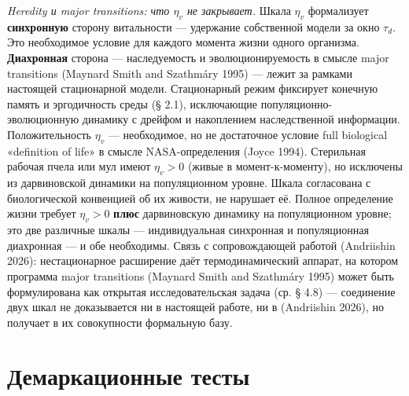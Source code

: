 \documentclass[pdflatex,sn-mathphys-ay]{sn-jnl}
\begin{document}
\emph{Heredity и major transitions: что \(\eta_v\) не закрывает.} Шкала \(\eta_v\) формализует \textbf{синхронную} сторону витальности --- удержание собственной модели за окно \(\tau_d\). Это необходимое условие для каждого момента жизни одного организма. \textbf{Диахронная} сторона --- наследуемость и эволюционируемость в смысле major transitions (Maynard Smith and Szathmáry 1995) --- лежит за рамками настоящей стационарной модели. Стационарный режим фиксирует конечную память и эргодичность среды (§ 2.1), исключающие популяционно-эволюционную динамику с дрейфом и накоплением наследственной информации. Положительность \(\eta_v\) --- необходимое, но не достаточное условие full biological «definition of life» в смысле NASA-определения (Joyce 1994). Стерильная рабочая пчела или мул имеют \(\eta_v > 0\) (живые в момент-к-моменту), но исключены из дарвиновской динамики на популяционном уровне. Шкала согласована с биологической конвенцией об их живости, не нарушает её. Полное определение жизни требует \(\eta_v > 0\) \textbf{плюс} дарвиновскую динамику на популяционном уровне; это две различные шкалы --- индивидуальная синхронная и популяционная диахронная --- и обе необходимы. Связь с сопровождающей работой (Andriishin 2026): нестационарное расширение даёт термодинамический аппарат, на котором программа major transitions (Maynard Smith and Szathmáry 1995) может быть формулирована как открытая исследовательская задача (ср. § 4.8) --- соединение двух шкал не доказывается ни в настоящей работе, ни в (Andriishin 2026), но получает в их совокупности формальную базу.

\section{Демаркационные тесты}\label{ux434ux435ux43cux430ux440ux43aux430ux446ux438ux43eux43dux43dux44bux435-ux442ux435ux441ux442ux44b}
\end{document}
